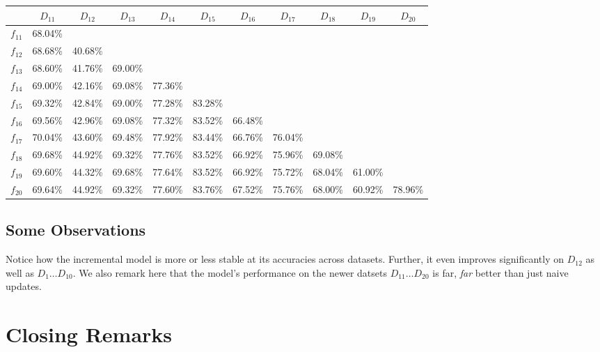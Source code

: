 \documentclass{article} %
\begin{document}
\begin{table}[H]
    \hspace{-1.0cm}
    \begin{tabular}{|c|c|c|c|c|c|c|c|c|c|c|}
        \hline
        & $D_{11}$ & $D_{12}$ & $D_{13}$ & $D_{14}$ & $D_{15}$ & $D_{16}$ & $D_{17}$ & $D_{18}$ & $D_{19}$ & $D_{20}$ \\
        \hline
	$f_{11}$ & 68.04\% & & & & & & & & & \\
	$f_{12}$ & 68.68\% & 40.68\% & & & & & & & & \\
	$f_{13}$ & 68.60\% & 41.76\% & 69.00\% & & & & & & & \\
	$f_{14}$ & 69.00\% & 42.16\% & 69.08\% & 77.36\% & & & & & & \\
	$f_{15}$ & 69.32\% & 42.84\% & 69.00\% & 77.28\% & 83.28\% & & & & & \\
	$f_{16}$ & 69.56\% & 42.96\% & 69.08\% & 77.32\% & 83.52\% & 66.48\% & & & & \\
	$f_{17}$ & 70.04\% & 43.60\% & 69.48\% & 77.92\% & 83.44\% & 66.76\% & 76.04\% & & & \\
	$f_{18}$ & 69.68\% & 44.92\% & 69.32\% & 77.76\% & 83.52\% & 66.92\% & 75.96\% & 69.08\% & & \\
	$f_{19}$ & 69.60\% & 44.32\% & 69.68\% & 77.64\% & 83.52\% & 66.92\% & 75.72\% & 68.04\% & 61.00\% & \\
	$f_{20}$ & 69.64\% & 44.92\% & 69.32\% & 77.60\% & 83.76\% & 67.52\% & 75.76\% & 68.00\% & 60.92\% & 78.96\% \\
        \hline
    \end{tabular}
\end{table}

\subsection{Some Observations}
Notice how the incremental model is more or less stable at its accuracies across datasets. Further, it even improves significantly on $D_{12}$ as well as $D_1 \dots D_{10}$. We also remark here that the model's performance on the newer datsets $D_{11} \dots D_{20}$ is far, \textit{far} better than just naive updates. 

\section{Closing Remarks}
\end{document}
